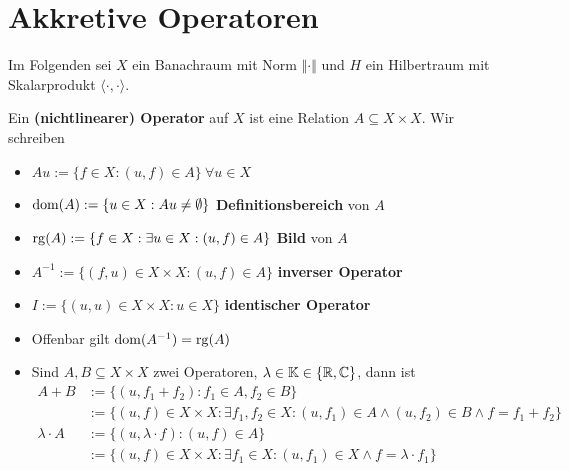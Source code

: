 
\chapter{Akkretive Operatoren}
Im Folgenden sei $X$ ein Banachraum mit Norm $\Vert\cdot\Vert$ und $H$ ein Hilbertraum mit Skalarprodukt $\langle\cdot,\cdot\rangle$.

\begin{definition}
	Ein \textbf{(nichtlinearer) Operator} auf $X$ ist eine Relation $A\subseteq X\times X$. Wir schreiben
	\begin{itemize}
		\item $Au:=\lbrace f\in X:(u,f)\in A\rbrace~\forall u\in X$
		\item $\operatorname{dom}(A):=\lbrace u\in X:Au\neq\emptyset\rbrace$ \textbf{Definitionsbereich} von $A$
		\item $\operatorname{rg}(A):=\lbrace f\in X:\exists u\in X:(u,f)\in A\rbrace$ \textbf{Bild} von $A$
		\item $A^{-1}:=\lbrace (f,u)\in X\times X:(u,f)\in A\rbrace$ \textbf{inverser Operator}
		\item $I:=\lbrace(u,u)\in X\times X:u\in X\rbrace$ \textbf{identischer Operator}
		\item Offenbar gilt $\operatorname{dom}(A^{-1})=\operatorname{rg}(A)$
		\item Sind $A,B\subseteq X\times X$ zwei Operatoren, $\lambda\in\mathbb{K}\in\lbrace\mathbb{R},\mathbb{C}\rbrace$, dann ist
		\begin{align*}
			A+B&:=\lbrace(u,f_1+f_2):f_1\in A,f_2\in B\rbrace\\
			&:=\lbrace(u,f)\in X\times X:\exists f_1,f_2\in X:(u,f_1)\in A\wedge(u,f_2)\in B\wedge f=f_1+f_2\rbrace\\
			\lambda\cdot A&:=\lbrace(u,\lambda\cdot f):(u,f)\in A\rbrace\\
			&:=\lbrace(u,f)\in X\times X:\exists f_1\in X:(u,f_1)\in X\wedge f=\lambda\cdot f_1\rbrace
		\end{align*}
	\end{itemize}
\end{definition}

